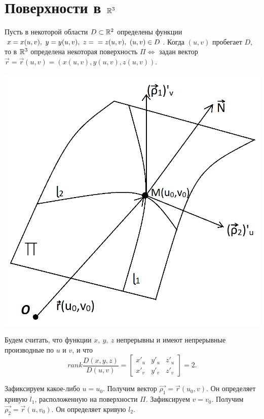 \documentclass[../../main.tex]{subfiles}
\begin{document}
\section{Поверхности в $\mathbb{R}^3$}

Пусть в некоторой области $D \subset \mathbb{R}^2$ определены функции 
$x = x(u,v),\ y =y(u,v),\ z = \\ = z(u,v),\ (u,v) \in D$. 
Когда $(u,v)$ пробегает $D$, то в $\mathbb{R}^3$
определена некоторая поверхность $\Pi 
\iff$ задан вектор $\vec{r} = \vec{r}(u,v) = (x(u,v), y(u,v), z(u,v))$.

\begin{center}
\includegraphics[scale = 0.5]{lec21_4.png}
\end{center}

Будем считать, что функции $x,\ y,\ z$ непрерывны и 
имеют непрерывные производные по $u$ и $v$, и что
\begin{equation}
\label{lec_21, num_2}
rank \dfrac{D(x,y,z)}{D(u,v)} = 
\begin{bmatrix}
x'_u & y'_u & z'_u \\
x'_v & y'_v & z'_v
\end{bmatrix} = 2.
\end{equation}

Зафиксируем какое-либо $u=u_0$. Получим вектор
$\vec{\rho_1} = \vec{r}(u_0,v)$. 
Он определяет кривую $l_1$, расположенную на поверхности $\Pi$.
Зафиксируем $v = v_0$. Получим $\vec{\rho_2} = \vec{r}(u,v_0)$. 
Он определяет кривую $l_2$.
\end{document}
